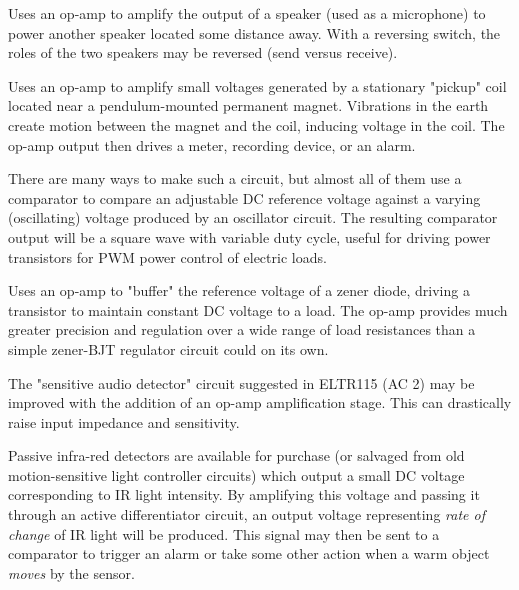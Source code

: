 \vskip 10pt

\noindent
{} Uses an op-amp to amplify the output of a speaker (used as a microphone) to power another speaker located some distance away.  With a reversing switch, the roles of the two speakers may be reversed (send versus receive).

\vskip 10pt

\noindent
{} Uses an op-amp to amplify small voltages generated by a stationary "pickup" coil located near a pendulum-mounted permanent magnet.  Vibrations in the earth create motion between the magnet and the coil, inducing voltage in the coil.  The op-amp output then drives a meter, recording device, or an alarm.

\vskip 10pt

\noindent
{} There are many ways to make such a circuit, but almost all of them use a comparator to compare an adjustable DC reference voltage against a varying (oscillating) voltage produced by an oscillator circuit.  The resulting comparator output will be a square wave with variable duty cycle, useful for driving power transistors for PWM power control of electric loads.

\vskip 10pt

\noindent
{} Uses an op-amp to "buffer" the reference voltage of a zener diode, driving a transistor to maintain constant DC voltage to a load.  The op-amp provides much greater precision and regulation over a wide range of load resistances than a simple zener-BJT regulator circuit could on its own.

\vskip 10pt

\noindent
{} The "sensitive audio detector" circuit suggested in ELTR115 (AC 2) may be improved with the addition of an op-amp amplification stage.  This can drastically raise input impedance and sensitivity.

\vskip 10pt

\noindent
{} Passive infra-red detectors are available for purchase (or salvaged from old motion-sensitive light controller circuits) which output a small DC voltage corresponding to IR light intensity.  By amplifying this voltage and passing it through an active differentiator circuit, an output voltage representing {\it rate of change} of IR light will be produced.  This signal may then be sent to a comparator to trigger an alarm or take some other action when a warm object {\it moves} by the sensor.

